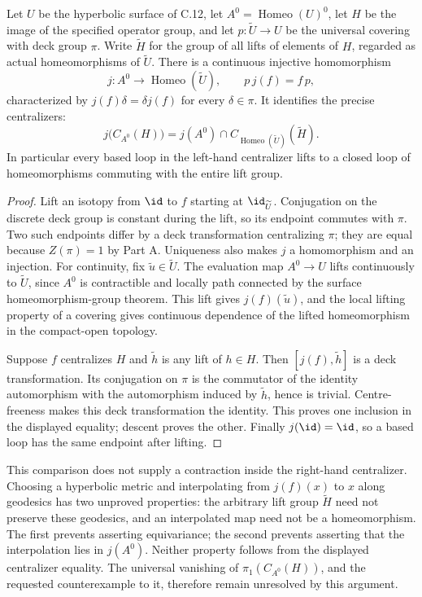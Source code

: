 Let $U$ be the hyperbolic surface of C.12, let $A^0=\operatorname{Homeo}(U)^0$, let $H$ be the image of the specified operator group, and let $p:\widetilde U\to U$ be the universal covering with deck group $\pi$. Write $\widetilde H$ for the group of all lifts of elements of $H$, regarded as actual homeomorphisms of $\widetilde U$. There is a continuous injective homomorphism
\[
 j:A^0\longrightarrow\operatorname{Homeo}(\widetilde U),
 \qquad p\,j(f)=f\,p,
\]
characterized by $j(f)\delta=\delta j(f)$ for every $\delta\in\pi$. It identifies the precise centralizers:
\[
 j\bigl(C_{A^0}(H)\bigr)
   =j(A^0)\cap C_{\operatorname{Homeo}(\widetilde U)}(\widetilde H).
\]
In particular every based loop in the left-hand centralizer lifts to a closed loop of homeomorphisms commuting with the entire lift group.
\begin{proof}
Lift an isotopy from $\id$ to $f$ starting at $\id_{\widetilde U}$. Conjugation on the discrete deck group is constant during the lift, so its endpoint commutes with $\pi$. Two such endpoints differ by a deck transformation centralizing $\pi$; they are equal because $Z(\pi)=1$ by Part A. Uniqueness also makes $j$ a homomorphism and an injection. For continuity, fix $\widetilde u\in\widetilde U$. The evaluation map $A^0\to U$ lifts continuously to $\widetilde U$, since $A^0$ is contractible and locally path connected by the surface homeomorphism-group theorem. This lift gives $j(f)(\widetilde u)$, and the local lifting property of a covering gives continuous dependence of the lifted homeomorphism in the compact-open topology.

Suppose $f$ centralizes $H$ and $\widetilde h$ is any lift of $h\in H$. Then $[j(f),\widetilde h]$ is a deck transformation. Its conjugation on $\pi$ is the commutator of the identity automorphism with the automorphism induced by $\widetilde h$, hence is trivial. Centre-freeness makes this deck transformation the identity. This proves one inclusion in the displayed equality; descent proves the other. Finally $j(\id)=\id$, so a based loop has the same endpoint after lifting.
\end{proof}

This comparison does not supply a contraction inside the right-hand centralizer. Choosing a hyperbolic metric and interpolating from $j(f)(x)$ to $x$ along geodesics has two unproved properties: the arbitrary lift group $\widetilde H$ need not preserve these geodesics, and an interpolated map need not be a homeomorphism. The first prevents asserting equivariance; the second prevents asserting that the interpolation lies in $j(A^0)$. Neither property follows from the displayed centralizer equality. The universal vanishing of $\pi_1(C_{A^0}(H))$, and the requested counterexample to it, therefore remain unresolved by this argument.

